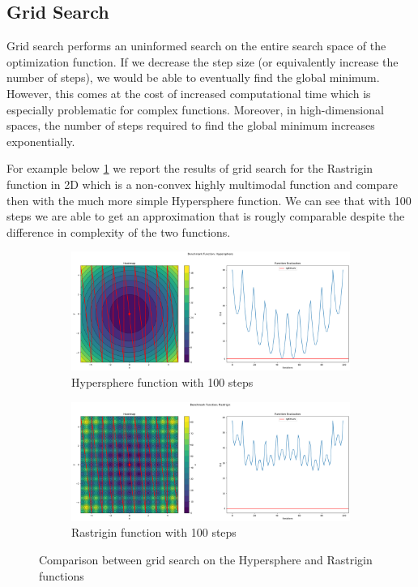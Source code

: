 \subsection{Grid Search}
\label{sec:grid-search}

Grid search performs an uninformed search on the entire search space of the optimization function. If we decrease the step size (or equivalently increase the number of steps), we would be able to eventually find the global minimum. However, this comes at the cost of increased computational time which is especially problematic for complex functions. Moreover, in high-dimensional spaces, the number of steps required to find the global minimum increases exponentially.

For example below \ref{fig:gs-100} we report the results of grid search for the Rastrigin function in 2D which is a non-convex highly multimodal function and compare then with the much more simple Hypersphere function. We can see that with 100 steps we are able to get an approximation that is rougly comparable despite the difference in complexity of the two functions.
\begin{figure}[H]
    \begin{subfigure}{0.5\textwidth}
        \includegraphics[width=\textwidth]{lab1/imgs/gs_sphere_100.png}
        \caption{Hypersphere function with 100 steps}
    \end{subfigure}
    \begin{subfigure}{0.5\textwidth}
        \includegraphics[width=\textwidth]{lab1/imgs/gs_rastrigin_100.png}
        \caption{Rastrigin function with 100 steps}
    \end{subfigure}
    \caption{Comparison between grid search on the Hypersphere and Rastrigin functions}
    \label{fig:gs-100}
\end{figure}

